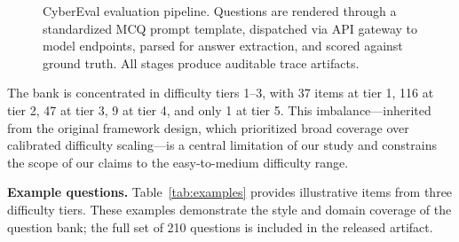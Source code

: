 \documentclass[final]{elsarticle}
\begin{document}
\begin{figure}[t]
\centering
{}
\caption{CyberEval evaluation pipeline. Questions are rendered through a standardized MCQ prompt template, dispatched via API gateway to model endpoints, parsed for answer extraction, and scored against ground truth. All stages produce auditable trace artifacts.}
\label{fig:architecture}
\end{figure}

The bank is concentrated in difficulty tiers 1--3, with 37 items at tier 1, 116 at tier 2, 47 at tier 3, 9 at tier 4, and only 1 at tier 5. This imbalance---inherited from the original framework design, which prioritized broad coverage over calibrated difficulty scaling---is a central limitation of our study and constrains the scope of our claims to the easy-to-medium difficulty range.

\textbf{Example questions.} Table~\ref{tab:examples} provides illustrative items from three difficulty tiers. These examples demonstrate the style and domain coverage of the question bank; the full set of 210 questions is included in the released artifact.
\end{document}

